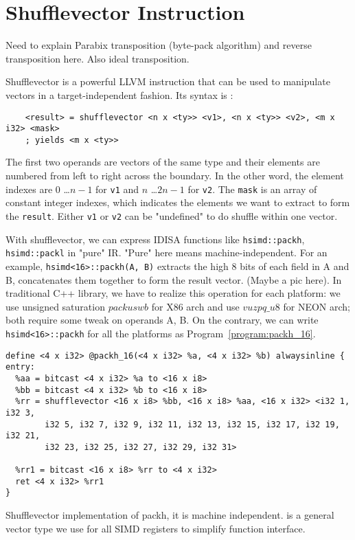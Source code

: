 %
%

\chapter{Shufflevector Instruction}
\label{three}

Need to explain Parabix transposition (byte-pack algorithm) and reverse transposition here. Also ideal transposition.

Shufflevector is a powerful LLVM instruction that can be used to manipulate vectors in a target-independent fashion. Its syntax is \cite{llvm_lang_ref}:

\begin{verbatim}
    <result> = shufflevector <n x <ty>> <v1>, <n x <ty>> <v2>, <m x i32> <mask>
    ; yields <m x <ty>>
\end{verbatim}

The first two operands are vectors of the same type and their elements are numbered from left to right across the boundary. In the other word, the element indexes are $0$ \ldots $n-1$ for {\tt v1} and $n$ \ldots $2n-1$ for {\tt v2}. The {\tt mask} is an array of constant integer indexes, which indicates the elements we want to extract to form the {\tt result}. Either {\tt v1} or {\tt v2} can be "undefined" to do shuffle within one vector.

With shufflevector, we can express IDISA functions like \verb|hsimd::packh|, \verb|hsimd::packl| in "pure" IR. "Pure" here means machine-independent. For an example, \verb|hsimd<16>::packh(A, B)| extracts the high 8 bits of each field in A and B, concatenates them together to form the result vector. (Maybe a pic here). In traditional C++ library, we have to realize this operation for each platform: we use unsigned saturation $packuswb$ for X86 arch and use $vuzpq\_u8$ for NEON arch; both require some tweak on operands A, B. On the contrary, we can write \verb|hsimd<16>::packh| for all the platforms as Program~\ref{program:packh_16}.

\begin{program}
\begin{verbatim}
define <4 x i32> @packh_16(<4 x i32> %a, <4 x i32> %b) alwaysinline {
entry:
  %aa = bitcast <4 x i32> %a to <16 x i8>
  %bb = bitcast <4 x i32> %b to <16 x i8>
  %rr = shufflevector <16 x i8> %bb, <16 x i8> %aa, <16 x i32> <i32 1, i32 3,
        i32 5, i32 7, i32 9, i32 11, i32 13, i32 15, i32 17, i32 19, i32 21,
        i32 23, i32 25, i32 27, i32 29, i32 31>

  %rr1 = bitcast <16 x i8> %rr to <4 x i32>
  ret <4 x i32> %rr1
}
\end{verbatim}
\caption[Shufflevector implementation of packh.]{Shufflevector implementation of packh, it is machine independent. {\tt <4 x i32>} is a general vector type we use for all SIMD registers to simplify function interface.}
\label{program:packh_16}
\end{program}

